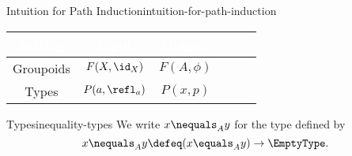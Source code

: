 \begin{intuition}{Intuition for Path Induction}{intuition-for-path-induction}
\begin{itemize}
    \end{itemize}
    \begingroup%
    \setlength\cellspacetoplimit{3pt}
    \setlength\cellspacebottomlimit{3pt}
    \renewcommand{\arraystretch}{1.2}
    \begin{center}
        \begin{tabular}{|Sc|Sc|Sc|}\hline{}
            \textcolor{white}{\textbf{Setting}}    & \textcolor{white}{\textbf{Input}} & \textcolor{white}{\textbf{Output}} \\\hline{}
            Groupoids                              & $F(X,\id_{X})$                    & $F(A,\phi)$                        \\
            Types                                  & $P(a,\refl_{a})$                  & $P(x,p)$                           \\\hline
        \end{tabular}
    \end{center}
    \endgroup
\end{intuition}
\begin{notation}{ Types}{inequality-types}%
    We write $x\nequals_{A}y$ for the type defined by
    \[
        x\nequals_{A}y%
        \defeq%
        (x\equals_{A}y)%
        \to%
        \EmptyType.%
    \]%
\end{notation}
